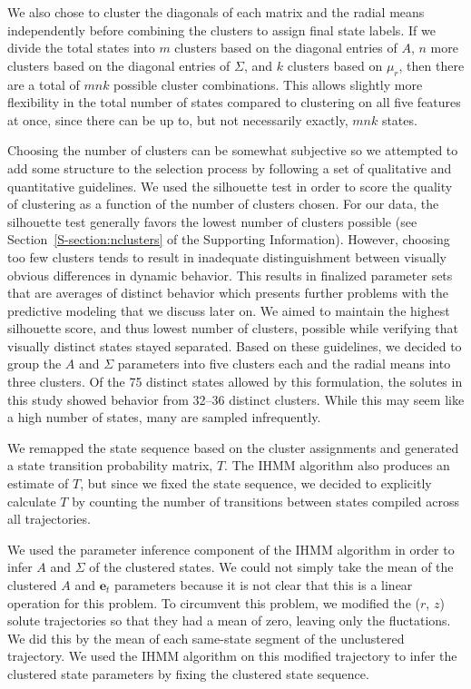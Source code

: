\documentclass{article}
\begin{document}
  We also chose to cluster the diagonals of each matrix and the radial means
  independently before combining the clusters to assign final state labels. If we divide
  the total states into $m$ clusters based on the diagonal entries of $A$, $n$ more clusters 
  based on the diagonal entries of $\Sigma$, and $k$ clusters based on $\mu_r$, then there
  are a total of $mnk$ possible cluster combinations. This allows slightly more flexibility
  in the total number of states compared to clustering on all five features at once, since 
  there can be up to, but not necessarily exactly, $mnk$ states. 
  
  Choosing the number of clusters can be somewhat subjective so
  we attempted to add some structure to the selection process by following
  a set of qualitative and quantitative guidelines. We used the silhouette 
  test in order to score the quality of clustering as a function of the number 
  of clusters chosen. For our data, the silhouette test generally favors the 
  lowest number of clusters possible (see Section~\ref{S-section:nclusters} of
  the Supporting Information). However, choosing too few clusters tends to 
  result in inadequate distinguishment between visually obvious differences in 
  dynamic behavior. This results in finalized parameter sets that are averages of
  distinct behavior which presents further problems with the predictive modeling
  that we discuss later on. We aimed to maintain the highest silhouette score,
  and thus lowest number of clusters, possible while verifying that visually 
  distinct states stayed separated. Based on these guidelines, we decided to 
  group the $A$ and $\Sigma$ parameters into five clusters each and the radial
  means into three clusters. Of the 75 distinct states allowed by this formulation,
  the solutes in this study showed behavior from 32--36 distinct clusters. While
  this may seem like a high number of states, many are sampled infrequently.

  We remapped the state sequence based on the cluster assignments and generated a
  state transition probability matrix, $T$. The IHMM algorithm also produces an estimate
  of $T$, but since we fixed the state sequence, we decided to explicitly calculate $T$ 
  by counting the number of transitions between states compiled across all trajectories.

  We used the parameter inference component of the IHMM algorithm in order to 
  infer $A$ and $\Sigma$ of the clustered states.
  We could not simply take the mean of the clustered $A$ and $\mathbf{e}_t$ 
  parameters because it is not clear that this is a linear 
  operation for this problem. To circumvent this problem, we modified the ($r$,
  $z$) solute trajectories so that they had a mean of zero, leaving only the 
  fluctations. We did this by the mean of each same-state segment of the 
  unclustered trajectory. We used the IHMM algorithm on this modified trajectory
  to infer the clustered state parameters by fixing the clustered state sequence. 
  
\end{document}
